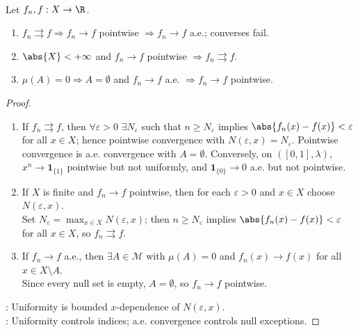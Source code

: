 \begin{proposition} \label{prop:basic-mode-implications} \\
Let $f_n,f:X\to\R$.
\begin{enumerate}[label=(\roman*)]
\setlength{\itemsep}{0pt}
\item $f_n\rightrightarrows f\Rightarrow f_n\to f$ pointwise $\Rightarrow f_n\to f$ a.e.; converses fail.
\item $\abs{X}<+\infty$ and $f_n\to f$ pointwise $\Rightarrow f_n\rightrightarrows f$.
\item $\mu(A)=0\Rightarrow A=\emptyset$ and $f_n\to f$ a.e. $\Rightarrow f_n\to f$ pointwise.
\end{enumerate}
\begin{proof}
\begin{enumerate}[label=(\roman*)]
\setlength{\itemsep}{0pt}
\item If $f_n\rightrightarrows f$, then $\forall\varepsilon>0$ $\exists N_\varepsilon$ such that $n\geq N_\varepsilon$ implies $\abs{f_n(x)-f(x)}<\varepsilon$ for all $x\in X$; hence pointwise convergence with $N(\varepsilon,x)=N_\varepsilon$. Pointwise convergence is a.e. convergence with $A=\emptyset$. Conversely, on $([0,1],\lambda)$, $x^n\to\mathbf{1}_{\{1\}}$ pointwise but not uniformly, and $\mathbf{1}_{\{0\}}\to0$ a.e. but not pointwise.
\item If $X$ is finite and $f_n\to f$ pointwise, then for each $\varepsilon>0$ and $x\in X$ choose $N(\varepsilon,x)$.\\
Set $N_\varepsilon=\max_{x\in X}N(\varepsilon,x)$; then $n\geq N_\varepsilon$ implies $\abs{f_n(x)-f(x)}<\varepsilon$ for all $x\in X$, so $f_n\rightrightarrows f$.
\item If $f_n\to f$ a.e., then $\exists A\in\mathcal{M}$ with $\mu(A)=0$ and $f_n(x)\to f(x)$ for all $x\in X\setminus A$.\\
Since every null set is empty, $A=\emptyset$, so $f_n\to f$ pointwise.
\end{enumerate}
: Uniformity is bounded $x$-dependence of $N(\varepsilon,x)$.\\
: Uniformity controls indices; a.e. convergence controls null exceptions.
\end{proof}
\end{proposition}

